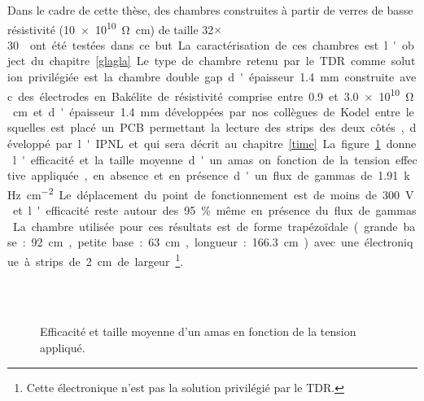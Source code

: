 Dans le cadre de cette thèse, des chambres construites à partir de verres de basse résistivité (\SI{10e10}{\ohm\centi\meter}) de taille \num{32}$\times$\SI{30}{\centi\meter\square} ont été testées dans ce but. La caractérisation de ces chambres est l'object du chapitre \ref{glagla}.


Le type de chambre retenu par le TDR comme solution privilégiée est la chambre double gap d'épaisseur \SI{1.4}{\milli\meter} construite avec des électrodes en Bakélite de résistivité comprise entre \num{0.9} et \SI{3.0e10}{\ohm\centi\meter} et d'épaisseur \SI{1.4}{\milli\meter} développées par nos collègues de Kodel entre lesquelles est placé un PCB permettant la lecture des strips des deux côtés, développé par l'IPNL et qui sera décrit au chapitre \ref{time}. 

La figure \ref{datairpc} donne l'efficacité et la taille moyenne d'un amas on fonction de la tension effective appliquée, en absence et en présence d'un flux de gammas de \SI{1.91}{\kilo\hertz\per\square\centi\meter}. Le déplacement du point de fonctionnement est de moins de \SI{300}{\volt} et l'efficacité reste autour des \num{95}\% même en présence du flux de gammas. La chambre utilisée pour ces résultats est de forme trapézoïdale (grande base : \SI{92}{\centi\meter}, petite base : \SI{63}{\centi\meter}, longueur : \SI{166.3}{\centi\meter}) avec une électronique à strips de \SI{2}{\centi\meter} de largeur\footnote{Cette électronique n'est pas la solution privilégié par le TDR.}.

\begin{figure}[ht!]
	\centering
	\\
	\\
	\caption{Efficacité et taille moyenne d'un amas en fonction de la tension appliqué.}
	\label{datairpc}
\end{figure}

